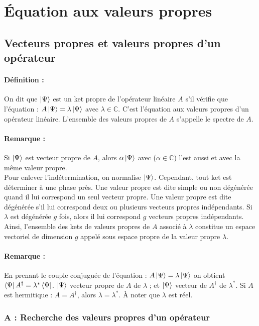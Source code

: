 \documentclass[12pt,a4paper,titlepage]{book}
\begin{document}
\section{Équation aux valeurs propres}
\subsection{Vecteurs propres et valeurs propres d'un opérateur}
\paragraph*{Définition :}
On dit que $\ket{\Psi}$ est un ket propre de l'opérateur linéaire $A$ s'il vérifie que l'équation : $A \ket{\Psi} = \lambda \ket{\Psi}$ avec $\lambda \in \mathbb{C}$. C'est l'équation aux valeurs propres d'un opérateur linéaire. L'ensemble des valeurs propres de $A$ s'appelle le spectre de $A$.
\paragraph*{Remarque :}
Si $\ket{\Psi}$ est vecteur propre de $A$, alors $\alpha \ket{\Psi}$ avec ($\alpha \in \mathbb{C}$) l'est aussi et avec la même valeur propre.\\

Pour enlever l'indétermination, on normalise $\ket{\Psi}$. Cependant, tout ket est déterminer à une phase près. Une valeur propre est dite simple ou non dégénérée quand il lui correspond un seul vecteur propre. Une valeur propre est dite dégénérée s'il lui correspond deux ou plusieurs vecteurs propres indépendants. Si $\lambda$ est dégénérée $g$ fois, alors il lui correspond $g$ vecteurs propres indépendants. Ainsi, l'ensemble des kets de valeurs propres de $A$ associé à $\lambda$ constitue un espace vectoriel de dimension $g$ appelé sous espace propre de la valeur propre $\lambda$.

\paragraph*{Remarque :}
En prenant le couple conjuguée de l'équation : $A \ket{\Psi} = \lambda \ket{\Psi}$ on obtient $\bra{\Psi} A^{\dagger} = \lambda^* \bra{\Psi}$. $\ket{\Psi}$ vecteur propre de $A$ de $\lambda$ ; et $\ket{\Psi}$ vecteur de $A^{\dagger}$ de $\lambda^*$. Si $A$ est hermitique : $A = A^{\dagger}$, alors $\lambda = \lambda^*$. À noter que $\lambda$ est réel.

\subsubsection{A : Recherche des valeurs propres d'un opérateur}
\end{document}
